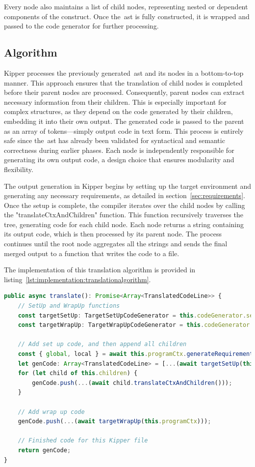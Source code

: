 Every node also maintains a list of child nodes, representing nested or dependent components of the construct. Once the~\acrshort{ast} is fully constructed, it is wrapped and passed to the code generator for further processing.

\subsection{Algorithm}

Kipper processes the previously generated~\acrshort{ast} and its nodes in a bottom-to-top manner. This approach ensures that the translation of child nodes is completed before their parent nodes are processed. Consequently, parent nodes can extract necessary information from their children. This is especially important for complex structures, as they depend on the code generated by their children, embedding it into their own output. The generated code is passed to the parent as an array of tokens—simply output code in text form. This process is entirely safe since the~\acrshort{ast} has already been validated for syntactical and semantic correctness during earlier phases. Each node is independently responsible for generating its own output code, a design choice that ensures modularity and flexibility.

The output generation in Kipper begins by setting up the target environment and generating any necessary requirements, as detailed in section~\ref{sec:requirements}. Once the setup is complete, the compiler iterates over the child nodes by calling the "translateCtxAndChildren" function. This function recursively traverses the tree, generating code for each child node. Each node returns a string containing its output code, which is then processed by its parent node. The process continues until the root node aggregates all the strings and sends the final merged output to a function that writes the code to a file.

The implementation of this translation algorithm is provided in listing~\ref{lst:implementation:translationalgorithm}.

\begin{lstlisting}[language=TypeScript,caption=The translation algorithm,label=lst:implementation:translationalgorithm]
public async translate(): Promise<Array<TranslatedCodeLine>> {
	// SetUp and WrapUp functions
	const targetSetUp: TargetSetUpCodeGenerator = this.codeGenerator.setUp;
	const targetWrapUp: TargetWrapUpCodeGenerator = this.codeGenerator.wrapUp;

	// Add set up code, and then append all children
	const { global, local } = await this.programCtx.generateRequirements();
	let genCode: Array<TranslatedCodeLine> = [...(await targetSetUp(this.programCtx, global)), ...local];
	for (let child of this.children) {
		genCode.push(...(await child.translateCtxAndChildren()));
	}

	// Add wrap up code
	genCode.push(...(await targetWrapUp(this.programCtx)));

	// Finished code for this Kipper file
	return genCode;
}
\end{lstlisting}


